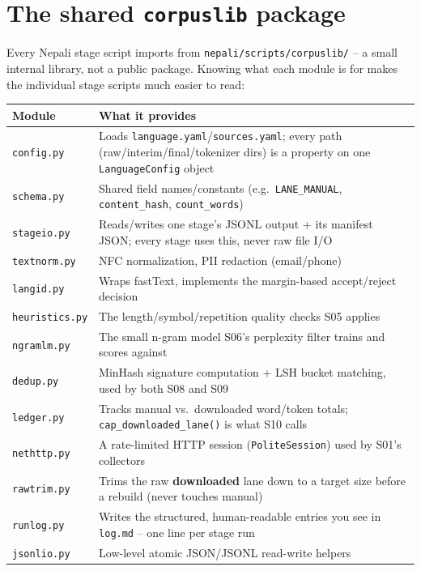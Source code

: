 \documentclass[11pt]{report}
\begin{document}
\section{The shared \texttt{corpuslib} package}

Every Nepali stage script imports from \texttt{nepali/scripts/corpuslib/}
-- a small internal library, not a public package. Knowing what each
module is for makes the individual stage scripts much easier to read:

\begin{center}
\begin{tabular}{ll}
\toprule
Module & What it provides \\
\midrule
\texttt{config.py} & Loads \texttt{language.yaml}/\texttt{sources.yaml};
every path (raw/interim/final/tokenizer dirs) is a property on one
\texttt{LanguageConfig} object \\
\texttt{schema.py} & Shared field names/constants (e.g.\
\texttt{LANE\_MANUAL}, \texttt{content\_hash}, \texttt{count\_words}) \\
\texttt{stageio.py} & Reads/writes one stage's JSONL output + its
manifest JSON; every stage uses this, never raw file I/O \\
\texttt{textnorm.py} & NFC normalization, PII redaction (email/phone) \\
\texttt{langid.py} & Wraps fastText, implements the margin-based
accept/reject decision \\
\texttt{heuristics.py} & The length/symbol/repetition quality checks S05
applies \\
\texttt{ngramlm.py} & The small n-gram model S06's perplexity filter
trains and scores against \\
\texttt{dedup.py} & MinHash signature computation + LSH bucket matching,
used by both S08 and S09 \\
\texttt{ledger.py} & Tracks manual vs.\ downloaded word/token totals;
\texttt{cap\_downloaded\_lane()} is what S10 calls \\
\texttt{nethttp.py} & A rate-limited HTTP session (\texttt{PoliteSession})
used by S01's collectors \\
\texttt{rawtrim.py} & Trims the raw \textbf{downloaded} lane down to a
target size before a rebuild (never touches manual) \\
\texttt{runlog.py} & Writes the structured, human-readable entries you
see in \texttt{log.md} -- one line per stage run \\
\texttt{jsonlio.py} & Low-level atomic JSON/JSONL read-write helpers \\
\bottomrule
\end{tabular}
\end{center}
\end{document}
